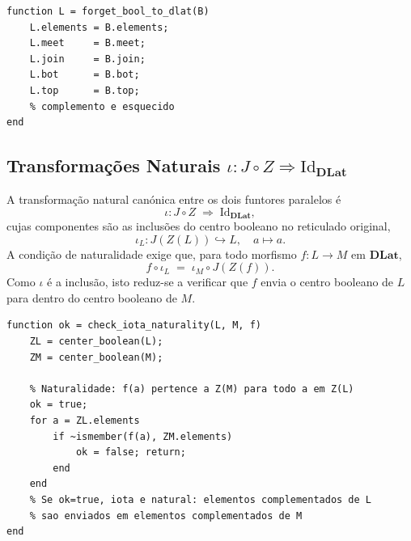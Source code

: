 \begin{lstlisting}[style=matlab, caption={Funtor de esquecimento $J: \mathbf{Bool} \to \mathbf{DLat}$}]
function L = forget_bool_to_dlat(B)
    L.elements = B.elements;
    L.meet     = B.meet;
    L.join     = B.join;
    L.bot      = B.bot;
    L.top      = B.top;
    % complemento e esquecido
end
\end{lstlisting}

\subsection{Transformações Naturais \texorpdfstring{$\iota: J \circ Z \Rightarrow \mathrm{Id}_{\mathbf{DLat}}$}{iota: JZ => Id}}

A transformação natural canónica entre os dois funtores paralelos é
\[
    \iota : J \circ Z \;\Rightarrow\; \mathrm{Id}_{\mathbf{DLat}},
\]
cujas componentes são as inclusões do centro booleano no reticulado original,
\[
    \iota_L : J(Z(L)) \hookrightarrow L, \quad a \mapsto a.
\]
A condição de naturalidade exige que, para todo morfismo $f: L \to M$ em $\mathbf{DLat}$,
\[
    f \circ \iota_L \;=\; \iota_M \circ J(Z(f)).
\]
Como $\iota$ é a inclusão, isto reduz-se a verificar que $f$ envia o centro booleano de $L$ para dentro do centro booleano de $M$.

\begin{lstlisting}[style=matlab, caption={Verificação da naturalidade de $\iota$ para um morfismo $f: L \to M$}]
function ok = check_iota_naturality(L, M, f)
    ZL = center_boolean(L);
    ZM = center_boolean(M);

    % Naturalidade: f(a) pertence a Z(M) para todo a em Z(L)
    ok = true;
    for a = ZL.elements
        if ~ismember(f(a), ZM.elements)
            ok = false; return;
        end
    end
    % Se ok=true, iota e natural: elementos complementados de L
    % sao enviados em elementos complementados de M
end
\end{lstlisting}